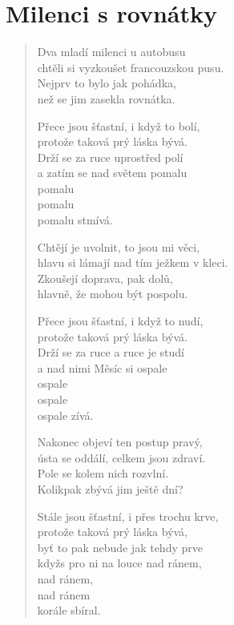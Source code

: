 \section{Milenci s rovnátky}

\thispagestyle{empty}

\begin{multicols}{2}

\begin{verse}
Dva mladí milenci u autobusu\\
chtěli si vyzkoušet francouzskou pusu.\\
Nejprv to bylo jak pohádka,\\
než se jim zasekla rovnátka.

Přece jsou šťastní, i když to bolí,\\
protože taková prý láska bývá.\\
Drží se za ruce uprostřed polí\\
a zatím se nad světem pomalu\\
pomalu\\
pomalu\\
pomalu stmívá.

Chtějí je uvolnit, to jsou mi věci,\\
hlavu si lámají nad tím ježkem v kleci.\\
Zkoušejí doprava, pak dolů,\\
hlavně, že mohou být pospolu.

Přece jsou šťastní, i když to nudí,\\
protože taková prý láska bývá.\\
Drží se za ruce a ruce je studí\\
a nad nimi Měsíc si ospale\\
ospale\\
ospale\\
ospale zívá.

\columnbreak

Nakonec objeví ten postup pravý,\\
ústa se oddálí, celkem jsou zdraví.\\
Pole se kolem nich rozvlní.\\
Kolikpak zbývá jim ještě dní?

Stále jsou šťastní, i přes trochu krve,\\
protože taková prý láska bývá,\\
byť to pak nebude jak tehdy prve\\
kdyžs pro ni na louce nad ránem,\\
nad ránem,\\
nad ránem\\
korále sbíral.
\end{verse}


\end{multicols}
